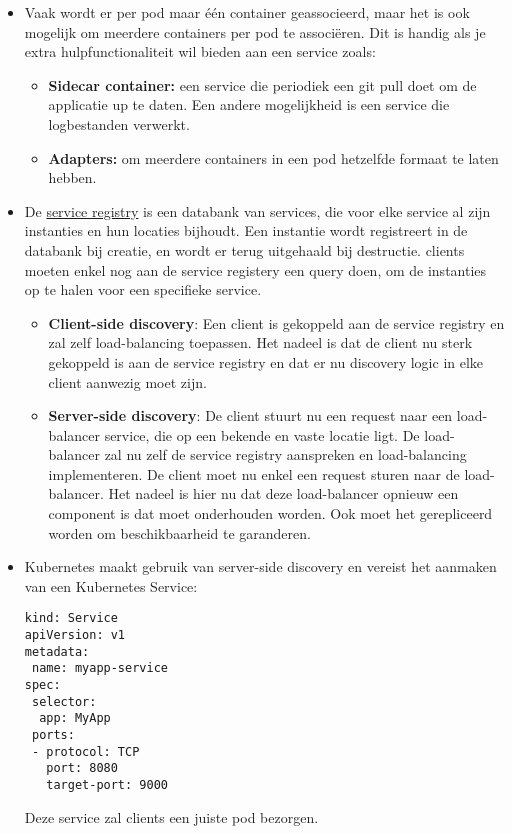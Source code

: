 \begin{itemize}
		\item  Vaak wordt er per pod maar één container geassocieerd, maar het is ook mogelijk om meerdere containers per pod te associëren. Dit is handig als je extra hulpfunctionaliteit wil bieden aan een service zoals:
		\begin{itemize} 
			\item  \textbf{Sidecar container:} een service die periodiek een git pull doet om de applicatie up te daten. Een andere mogelijkheid is een service die logbestanden verwerkt.
			\item  \textbf{Adapters:} om meerdere containers in een pod hetzelfde formaat te laten hebben.
		\end{itemize}

		\item  De \underline{service registry} is een databank van services, die voor elke service al zijn instanties en hun locaties bijhoudt. Een instantie wordt registreert in de databank bij creatie, en wordt er terug uitgehaald bij destructie. clients moeten enkel nog aan de service registery een query doen, om de instanties op te halen voor een specifieke service. 
		\begin{itemize}
			\item  \textbf{Client-side discovery}: Een client is gekoppeld aan de service registry en zal zelf load-balancing toepassen. Het nadeel is dat de client nu sterk gekoppeld is aan de service registry en dat er nu discovery logic in elke client aanwezig moet zijn.
			\item  \textbf{Server-side discovery}: De client stuurt nu een request naar een load-balancer service, die op een bekende en vaste locatie ligt. De load-balancer zal nu zelf de service registry aanspreken en load-balancing implementeren. De client moet nu enkel een request sturen naar de load-balancer. Het nadeel is hier nu dat deze load-balancer opnieuw een component is dat moet onderhouden worden. Ook moet het gerepliceerd worden om beschikbaarheid te garanderen.
		\end{itemize}

		\item  Kubernetes maakt gebruik van server-side discovery en vereist het aanmaken van een Kubernetes Service:
		\begin{lstlisting}
kind: Service
apiVersion: v1
metadata:
 name: myapp-service
spec:
 selector:
  app: MyApp
 ports:
 - protocol: TCP
   port: 8080
   target-port: 9000
		\end{lstlisting}
		Deze service zal clients een juiste pod bezorgen. 
	

\end{itemize}
